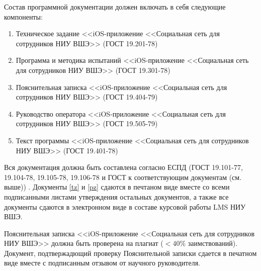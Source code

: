 Состав программной документации должен включать в себя следующие компоненты:
\begin{enumerate}
	\item Техническое задание <<iOS-приложение <<Социальная сеть для сотрудников НИУ ВШЭ>> (ГОСТ 19.201-78) \label{tz}
	\item Программа и методика испытаний <<iOS-приложение <<Социальная сеть для сотрудников НИУ ВШЭ>> (ГОСТ 19.301-78) \label{pmi}
	\item Пояснительная записка <<iOS-приложение <<Социальная сеть для сотрудников НИУ ВШЭ>> (ГОСТ 19.404-79) \label{pz}
	\item Руководство оператора <<iOS-приложение <<Социальная сеть для сотрудников НИУ ВШЭ>> (ГОСТ 19.505-79) \label{ro}
	\item Текст программы <<iOS-приложение <<Социальная сеть для сотрудников НИУ ВШЭ>> (ГОСТ 19.401-78) \label{tp}
\end{enumerate}

\indent
Вся документация должна быть составлена согласно ЕСПД (ГОСТ 19.101-77, 19.104-78, 19.105-78, 19.106-78 и ГОСТ к соответствующим документам (см. выше)) \cite{gost}. Документы \ref{tz} и \ref{pz} сдаются в печтаном виде вместе со всеми подписанными листами утверждения остальных документов, а также все документы сдаются в электронном виде в составе курсовой работы LMS НИУ ВШЭ.

Пояснительная записка <<iOS-приложение <<Социальная сеть для сотрудников НИУ ВШЭ>> должна быть проверена на плагиат ($< 40\% $ заимствований). Документ, подтвержадющий проверку Пояснительной записки сдается в печатном виде вместе с подписанным отзывом от научного руководителя.
